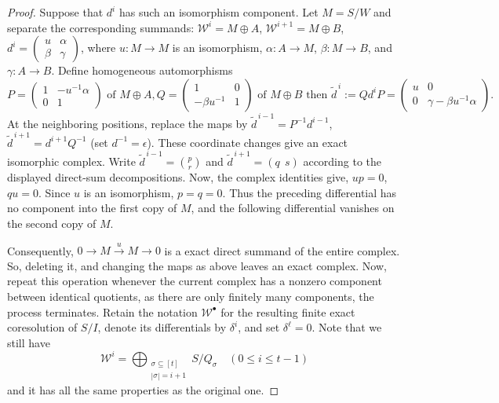 \documentclass[11pt,letterpaper]{amsart}
\newcommand{\x}{\xrightarrow{}}
\theoremstyle{plain}
\theoremstyle{definition}
\theoremstyle{remark}
\begin{document}
\begin{proof}
Suppose that $d^i$ has such an isomorphism component.
Let
$M=S/W$ and separate the corresponding summands: $
\mathcal W^i=M\oplus A$, $
\mathcal W^{i+1}=M\oplus B$, $d^i=
\begin{pmatrix}
u&\alpha\\
\beta&\gamma
\end{pmatrix}$, where $u:M\to M$ is an isomorphism,
$\alpha:A\to M$, $\beta:M\to B$, and $\gamma:A\to B$.
Define homogeneous automorphisms
\[
P=
\begin{pmatrix}
1&-u^{-1}\alpha\\
0&1
\end{pmatrix}
\text{ of }M\oplus A,
Q=
\begin{pmatrix}
1&0\\
-\beta u^{-1}&1
\end{pmatrix}
\text{ of }M\oplus B\text{ then }
\widetilde d^{\,i}:=Qd^iP
=
\begin{pmatrix}
u&0\\
0&\gamma-\beta u^{-1}\alpha
\end{pmatrix}.
\]
At the neighboring positions, replace the maps by $\widetilde d^{\,i-1}=P^{-1}d^{i-1}$, $\widetilde d^{\,i+1}=d^{i+1}Q^{-1}$ (set $d^{-1}=\epsilon$).
These coordinate changes give an exact isomorphic complex. Write
$\widetilde d^{\,i-1}=\binom{p}{r}$ and
$\widetilde d^{\,i+1}=(q\ \ s)$ according to the displayed
direct-sum decompositions. Now, the complex identities give, $up=0$, $qu=0$. Since $u$ is an isomorphism,  $p=q=0$.
Thus the preceding differential has no component into
the first copy of $M$, and the following differential
vanishes on the second copy of $M$.

Consequently, $
0\x M\xrightarrow{u}M\x0$ 
is a exact direct summand of the entire complex. So, deleting it, and changing the maps as above leaves an exact complex. Now, repeat this operation whenever the current complex has
a nonzero component between identical quotients, as there are only finitely many components, the process terminates.
Retain the notation $\mathcal W^\bullet$ for the resulting
finite exact coresolution of $S/I$, denote its differentials
by $\delta^i$, and set $\delta^\ell=0$. Note that we still have $$\mathcal{W}^i=\bigoplus_{\substack{\sigma\subseteq[t]\\|\sigma|=i+1}}
S/Q_\sigma
\quad(0\leq i\leq t-1)$$ and it has all the same properties as the original one.


\end{proof}
\end{document}
